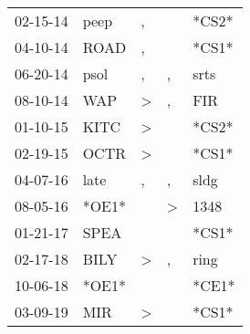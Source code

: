 \begin{supertabular}{p{0.07\textwidth}p{0.06\textwidth}p{0.02\textwidth}p{0.02\textwidth}p{0.06\textwidth}}
 02-15-14\textsuperscript{} &  peep\textsuperscript{} &             , &               &                   *CS2* \\
 04-10-14\textsuperscript{} &  ROAD\textsuperscript{} &             , &               &                   *CS1* \\
 06-20-14\textsuperscript{} &  psol\textsuperscript{} &             , &             , &  srts\textsuperscript{} \\
 08-10-14\textsuperscript{} &   WAP\textsuperscript{} &  \textgreater &             , &   FIR\textsuperscript{} \\
 01-10-15\textsuperscript{} &  KITC\textsuperscript{} &  \textgreater &               &                   *CS2* \\
 02-19-15\textsuperscript{} &  OCTR\textsuperscript{} &  \textgreater &               &                   *CS1* \\
 04-07-16\textsuperscript{} &  late\textsuperscript{} &             , &             , &  sldg\textsuperscript{} \\
 08-05-16\textsuperscript{} &                   *OE1* &               &  \textgreater &  1348\textsuperscript{} \\
 01-21-17\textsuperscript{} &  SPEA\textsuperscript{} &               &               &                   *CS1* \\
 02-17-18\textsuperscript{} &  BILY\textsuperscript{} &  \textgreater &             , &  ring\textsuperscript{} \\
 10-06-18\textsuperscript{} &                   *OE1* &               &               &                   *CE1* \\
 03-09-19\textsuperscript{} &   MIR\textsuperscript{} &  \textgreater &               &                   *CS1* \\
\end{supertabular}
